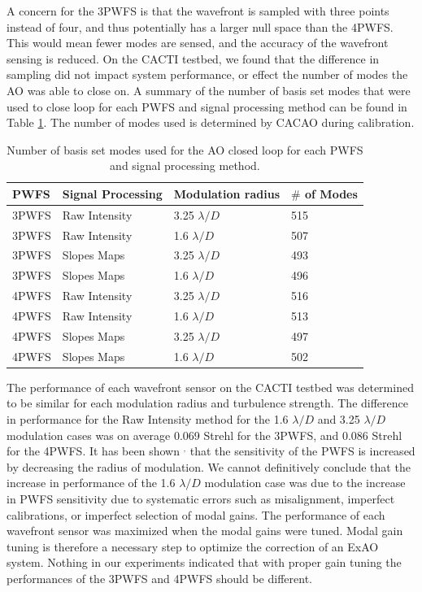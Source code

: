 A concern for the 3PWFS is that the wavefront is sampled with three points instead of four, and thus potentially has a larger null space than the 4PWFS. This would mean fewer modes are sensed, and the accuracy of the wavefront sensing is reduced. On the CACTI testbed, we found that the difference in sampling did not impact system performance, or effect the number of modes the AO was able to close on. A summary of the number of basis set modes that were used to close loop for each PWFS and signal processing method can be found in Table \ref{tab:Modestable}. The number of modes used is determined by CACAO during calibration. 

\begin{table}
	\begin{center}
		\begin{tabular}{ | l|l|l | l| }
			\hline
			\textbf{PWFS}& \textbf{Signal Processing} &\textbf{Modulation radius} &\textbf{$\#$ of Modes}\\ \hline
             3PWFS & Raw Intensity & 3.25 $\lambda/D$ & 515\\ \hline
             3PWFS & Raw Intensity & 1.6 $\lambda/D$ & 507 \\ \hline
             3PWFS & Slopes Maps &  3.25 $\lambda/D$ &493 \\ \hline
             3PWFS & Slopes Maps &  1.6 $\lambda/D$ & 496\\ \hline
             4PWFS & Raw Intensity & 3.25 $\lambda/D$ & 516\\ \hline
             4PWFS & Raw Intensity & 1.6 $\lambda/D$ & 513\\ \hline
             4PWFS & Slopes Maps &  3.25 $\lambda/D$ & 497 \\ \hline
             4PWFS & Slopes Maps &  1.6 $\lambda/D$ & 502\\ \hline
			\end{tabular}
		\end{center}
	\caption{Number of basis set modes used for the AO closed loop for each PWFS and signal processing method.}
	\label{tab:Modestable}
\end{table}

The performance of each wavefront sensor on the CACTI testbed was determined to be similar for each modulation radius and turbulence strength. The difference in performance for the Raw Intensity method for the 1.6 $\lambda/D$ and 3.25 $\lambda/D$ modulation cases was on average 0.069 Strehl for the 3PWFS, and 0.086 Strehl for the 4PWFS. It has been shown \cite{guyon2005}$^,$ \cite{verinaud2004nature} that the sensitivity of the PWFS is increased by decreasing the radius of modulation. We cannot definitively conclude that the increase in performance of the 1.6 $\lambda/D$ modulation case was due to the increase in PWFS sensitivity due to systematic errors such as misalignment, imperfect calibrations, or imperfect selection of modal gains. The performance of each wavefront sensor was maximized when the modal gains were tuned. Modal gain tuning is therefore a necessary step to optimize the correction of an ExAO system. Nothing in our experiments indicated that with proper gain tuning the performances of the 3PWFS and 4PWFS should be different.

